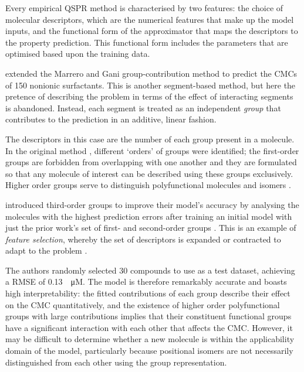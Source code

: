 Every empirical QSPR method is characterised by two features: the choice of
molecular descriptors, which are the numerical features that make up the model
inputs, and the functional form of the approximator that maps the descriptors to
the property prediction. This functional form includes the parameters that are
optimised based upon the training data.

\citet{matteiModelingCriticalMicelle2013} extended the Marrero and Gani
group-contribution method \cite{ganiAutomaticCreationMissing2005} to predict the
CMCs of 150 nonionic surfactants. This is another segment-based method, but here
the pretence of describing the problem in terms of the effect of interacting
segments is abandoned. Instead, each segment is treated as an independent
\emph{group} that contributes to the prediction in an additive, linear fashion.

The descriptors in this case are the number of each group present in a molecule.
In the original method \cite{ganiAutomaticCreationMissing2005}, different
`orders' of groups were identified; the first-order groups are forbidden from
overlapping with one another and they are formulated so that any molecule of
interest can be described using these groups exclusively. Higher order groups
serve to distinguish polyfunctional molecules and isomers
\cite{ganiAutomaticCreationMissing2005}.

\citet{matteiModelingCriticalMicelle2013} introduced third-order groups to
improve their model's accuracy by analysing the molecules with the highest
prediction errors after training an initial model with just the prior work's set
of first- and second-order groups \cite{ganiAutomaticCreationMissing2005}. This
is an example of \emph{feature selection}, whereby the set of descriptors is
expanded or contracted to adapt to the problem
\cite{liFeatureSelectionData2017,guyonIntroductionVariableFeature2003}.

The authors randomly selected 30 compounds to use as a test dataset, achieving a
RMSE of \SI{0.13}{\log \micro M}. The model is therefore remarkably accurate and
boasts high interpretability: the fitted contributions of each group describe
their effect on the CMC quantitatively, and the existence of higher order
polyfunctional groups with large contributions implies that their constituent
functional groups have a significant interaction with each other that affects
the CMC. However, it may be difficult to determine whether a new molecule is
within the applicability domain of the model, particularly because positional
isomers are not necessarily distinguished from each other using the group
representation.

